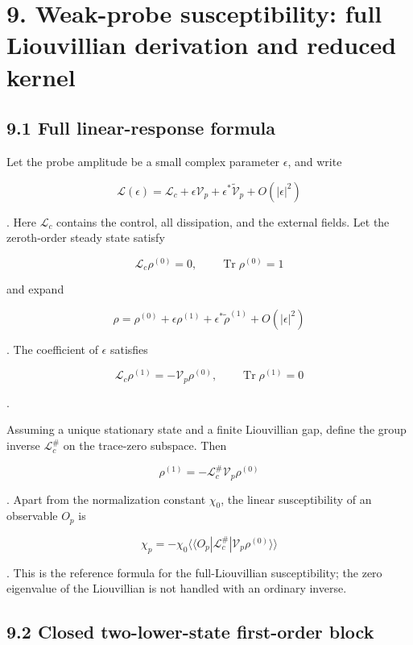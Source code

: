 \documentclass[
  10pt,
  a4paper,
]{article}
\begin{document}
\section{9. Weak-probe susceptibility: full Liouvillian derivation and
reduced
kernel}\label{weak-probe-susceptibility-full-liouvillian-derivation-and-reduced-kernel}

\subsection{9.1 Full linear-response
formula}\label{full-linear-response-formula}

Let the probe amplitude be a small complex parameter \(\epsilon\), and
write

\[
\mathcal L(\epsilon)
=\mathcal L_c
+\epsilon\mathcal V_p
+\epsilon^*\widetilde{\mathcal V}_p
+O(|\epsilon|^2)
\]

. Here \(\mathcal L_c\) contains the control, all dissipation, and the
external fields. Let the zeroth-order steady state satisfy

\[
\mathcal L_c\rho^{(0)}=0,
\qquad
\operatorname{Tr}\rho^{(0)}=1
\]

and expand

\[
\rho
=\rho^{(0)}
+\epsilon\rho^{(1)}
+\epsilon^*\widetilde\rho^{(1)}
+O(|\epsilon|^2)
\]

. The coefficient of \(\epsilon\) satisfies

\[
\mathcal L_c\rho^{(1)}
=-\mathcal V_p\rho^{(0)},
\qquad
\operatorname{Tr}\rho^{(1)}=0
\]

.

Assuming a unique stationary state and a finite Liouvillian gap, define
the group inverse \(\mathcal L_c^\#\) on the trace-zero subspace. Then

\[
\boxed{
\rho^{(1)}
=-\mathcal L_c^\#
\mathcal V_p\rho^{(0)}
}
\]

. Apart from the normalization constant \(\chi_0\), the linear
susceptibility of an observable \(O_p\) is

\[
\boxed{
\chi_p
=-\chi_0
\langle\!\langle O_p|
\mathcal L_c^\#
|\mathcal V_p\rho^{(0)}\rangle\!\rangle
}
\]

. This is the reference formula for the full-Liouvillian susceptibility;
the zero eigenvalue of the Liouvillian is not handled with an ordinary
inverse.

\subsection{9.2 Closed two-lower-state first-order
block}\label{closed-two-lower-state-first-order-block}
\end{document}
